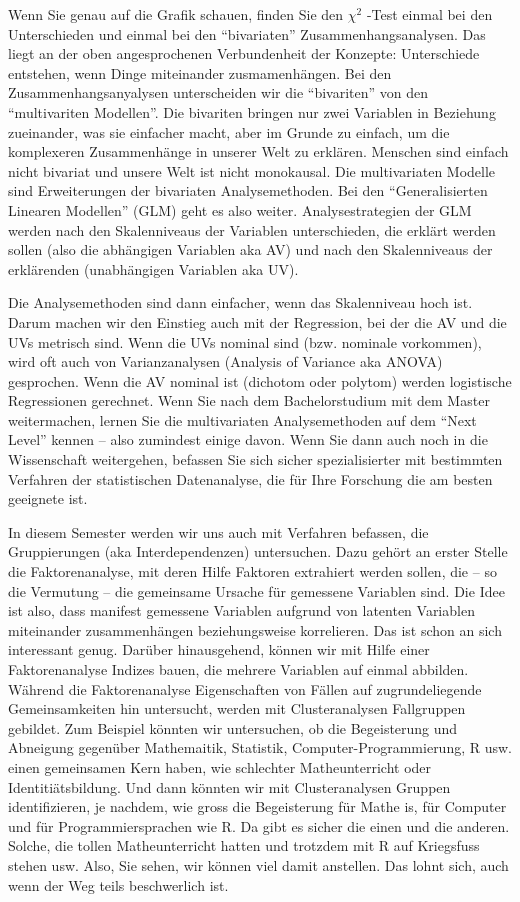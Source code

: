 \documentclass[
  10pt,
  letterpaper,
  a4paper, twoside]{scrreprt}
\begin{document}
Wenn Sie genau auf die Grafik schauen, finden Sie den \(\chi^2\) -Test
einmal bei den Unterschieden und einmal bei den \enquote{bivariaten}
Zusammenhangsanalysen. Das liegt an der oben angesprochenen
Verbundenheit der Konzepte: Unterschiede entstehen, wenn Dinge
miteinander zusmamenhängen. Bei den Zusammenhangsanyalysen unterscheiden
wir die \enquote{bivariten} von den \enquote{multivariten Modellen}. Die
bivariten bringen nur zwei Variablen in Beziehung zueinander, was sie
einfacher macht, aber im Grunde zu einfach, um die komplexeren
Zusammenhänge in unserer Welt zu erklären. Menschen sind einfach nicht
bivariat und unsere Welt ist nicht monokausal. Die multivariaten Modelle
sind Erweiterungen der bivariaten Analysemethoden. Bei den
\enquote{Generalisierten Linearen Modellen} (GLM) geht es also weiter.
Analysestrategien der GLM werden nach den Skalenniveaus der Variablen
unterschieden, die erklärt werden sollen (also die abhängigen Variablen
aka AV) und nach den Skalenniveaus der erklärenden (unabhängigen
Variablen aka UV).

Die Analysemethoden sind dann einfacher, wenn das Skalenniveau hoch ist.
Darum machen wir den Einstieg auch mit der Regression, bei der die AV
und die UVs metrisch sind. Wenn die UVs nominal sind (bzw. nominale
vorkommen), wird oft auch von Varianzanalysen (Analysis of Variance aka
ANOVA) gesprochen. Wenn die AV nominal ist (dichotom oder polytom)
werden logistische Regressionen gerechnet. Wenn Sie nach dem
Bachelorstudium mit dem Master weitermachen, lernen Sie die
multivariaten Analysemethoden auf dem \enquote{Next Level} kennen --
also zumindest einige davon. Wenn Sie dann auch noch in die Wissenschaft
weitergehen, befassen Sie sich sicher spezialisierter mit bestimmten
Verfahren der statistischen Datenanalyse, die für Ihre Forschung die am
besten geeignete ist.

In diesem Semester werden wir uns auch mit Verfahren befassen, die
Gruppierungen (aka Interdependenzen) untersuchen. Dazu gehört an erster
Stelle die Faktorenanalyse, mit deren Hilfe Faktoren extrahiert werden
sollen, die -- so die Vermutung -- die gemeinsame Ursache für gemessene
Variablen sind. Die Idee ist also, dass manifest gemessene Variablen
aufgrund von latenten Variablen miteinander zusammenhängen
beziehungsweise korrelieren. Das ist schon an sich interessant genug.
Darüber hinausgehend, können wir mit Hilfe einer Faktorenanalyse Indizes
bauen, die mehrere Variablen auf einmal abbilden. Während die
Faktorenanalyse Eigenschaften von Fällen auf zugrundeliegende
Gemeinsamkeiten hin untersucht, werden mit Clusteranalysen Fallgruppen
gebildet. Zum Beispiel könnten wir untersuchen, ob die Begeisterung und
Abneigung gegenüber Mathemaitik, Statistik, Computer-Programmierung, R
usw. einen gemeinsamen Kern haben, wie schlechter Matheunterricht oder
Identitiätsbildung. Und dann könnten wir mit Clusteranalysen Gruppen
identifizieren, je nachdem, wie gross die Begeisterung für Mathe is, für
Computer und für Programmiersprachen wie R. Da gibt es sicher die einen
und die anderen. Solche, die tollen Matheunterricht hatten und trotzdem
mit R auf Kriegsfuss stehen usw. Also, Sie sehen, wir können viel damit
anstellen. Das lohnt sich, auch wenn der Weg teils beschwerlich ist.
\end{document}
